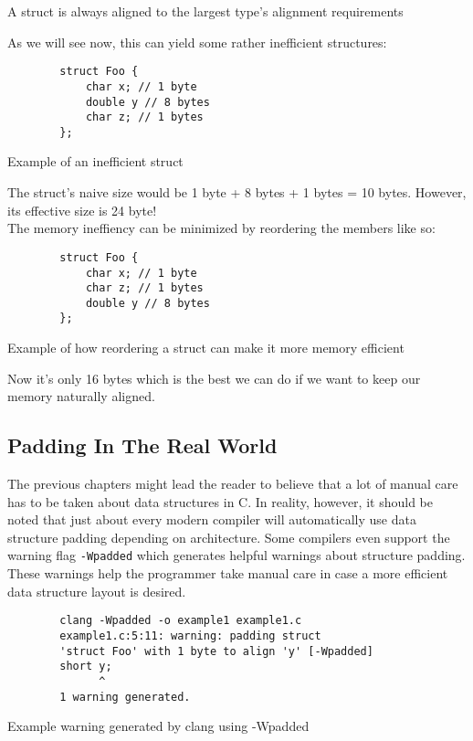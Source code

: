 \documentclass[a4paper,12pt]{scrartcl}
\begin{document}
\begin{framed}
    A struct is always aligned to the largest type's alignment requirements
\end{framed}
\noindent
As we will see now, this can yield some rather inefficient structures:
\begin{listing}[H]
    \begin{verbatim}
        struct Foo {
            char x; // 1 byte
            double y // 8 bytes
            char z; // 1 bytes
        };
    \end{verbatim}
    \caption{Example of an inefficient struct}
\end{listing}
The struct's naive size would be 1 byte + 8 bytes + 1 bytes = 10 bytes. However, its effective size is 24 byte!
\\
The memory ineffiency can be minimized by reordering the members like so:
\begin{listing}[H]
    \begin{verbatim}
        struct Foo {
            char x; // 1 byte
            char z; // 1 bytes
            double y // 8 bytes
        };
    \end{verbatim}
    \caption{Example of how reordering a struct can make it more memory efficient}
\end{listing}
\noindent
Now it's only 16 bytes which is the best we can do if we want to keep our memory naturally aligned.

\subsection{Padding In The Real World}
The previous chapters might lead the reader to believe that a lot of manual care has to be taken
about data structures in C. In reality, however, it should be noted that just about every
modern compiler will automatically use data structure padding depending on architecture.
Some compilers even support the warning flag \verb|-Wpadded| which generates helpful warnings
about structure padding. These warnings help the programmer take manual care in case a more
efficient data structure layout is desired.
\begin{listing}[H]
    \begin{verbatim}
        clang -Wpadded -o example1 example1.c
        example1.c:5:11: warning: padding struct 
        'struct Foo' with 1 byte to align 'y' [-Wpadded]
        short y;
              ^
        1 warning generated.
    \end{verbatim}
    \caption{Example warning generated by clang using -Wpadded}
\end{listing}
\end{document}
